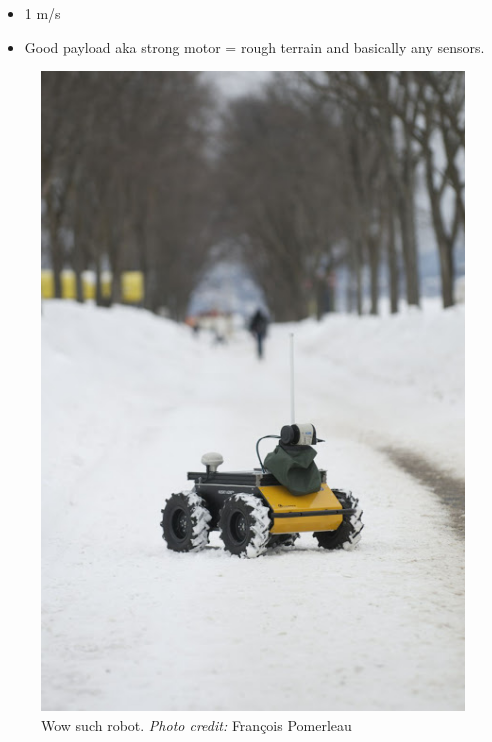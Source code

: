 \begin{itemize}
    \item 1 m/s
    \item Good payload aka strong motor = rough terrain and basically any sensors.
\end{itemize}
\begin{figure}
    \centering
    \includegraphics[width=0.95\linewidth]{img/chap_slam/husky.jpg}
    \caption{Wow such robot. \emph{Photo credit:} François Pomerleau}
    \label{fig:chap_slam_husky}
\end{figure}
